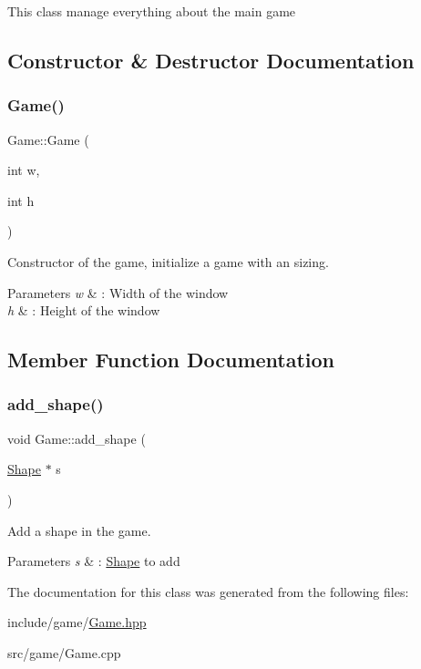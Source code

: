This class manage everything about the main game 

\subsection{Constructor \& Destructor Documentation}
\mbox{\label{classGame_a2b0cb8af7b823a6d595eef9c9641f806}} 
\subsubsection{\texorpdfstring{Game()}{Game()}}
{\footnotesize\ttfamily Game\+::\+Game (\begin{DoxyParamCaption}\item[{int}]{w,  }\item[{int}]{h }\end{DoxyParamCaption})}



Constructor of the game, initialize a game with an sizing. 


\begin{DoxyParams}{Parameters}
{\em w} & \+: Width of the window \\
\hline
{\em h} & \+: Height of the window \\
\hline
\end{DoxyParams}


\subsection{Member Function Documentation}
\mbox{\label{classGame_a4c5fae4c7855b0a391c7190889db25d7}} 
\subsubsection{\texorpdfstring{add\+\_\+shape()}{add\_shape()}}
{\footnotesize\ttfamily void Game\+::add\+\_\+shape (\begin{DoxyParamCaption}\item[{\hyperlink{classShape}{Shape} $\ast$}]{s }\end{DoxyParamCaption})}



Add a shape in the game. 


\begin{DoxyParams}{Parameters}
{\em s} & \+: \hyperlink{classShape}{Shape} to add \\
\hline
\end{DoxyParams}


The documentation for this class was generated from the following files\+:\begin{DoxyCompactItemize}
\item 
include/game/\hyperlink{Game_8hpp}{Game.\+hpp}\item 
src/game/Game.\+cpp\end{DoxyCompactItemize}
